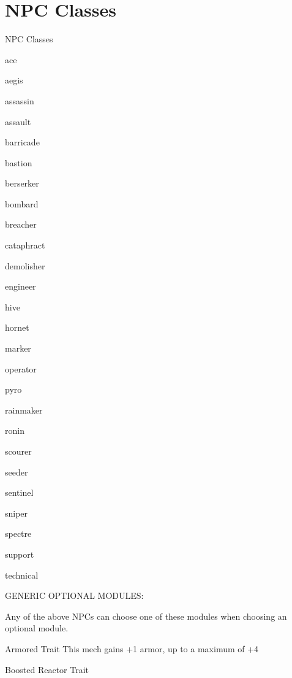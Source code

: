 \section{NPC Classes}

        NPC Classes

{ace}

{aegis}

{assassin}

{assault}

{barricade}

{bastion}

{berserker}

{bombard}

{breacher}

{cataphract}

{demolisher}

{engineer}

{hive}

{hornet}

{marker}

{operator}

{pyro}

{rainmaker}

{ronin}

{scourer}

{seeder}

{sentinel}

{sniper}

{spectre}

{support}

{technical}

                                     GENERIC OPTIONAL MODULES:

Any of the above NPCs can choose one of these modules when choosing an optional module.


Armored
Trait
This mech gains +1 armor, up to a maximum of +4


Boosted Reactor
Trait


